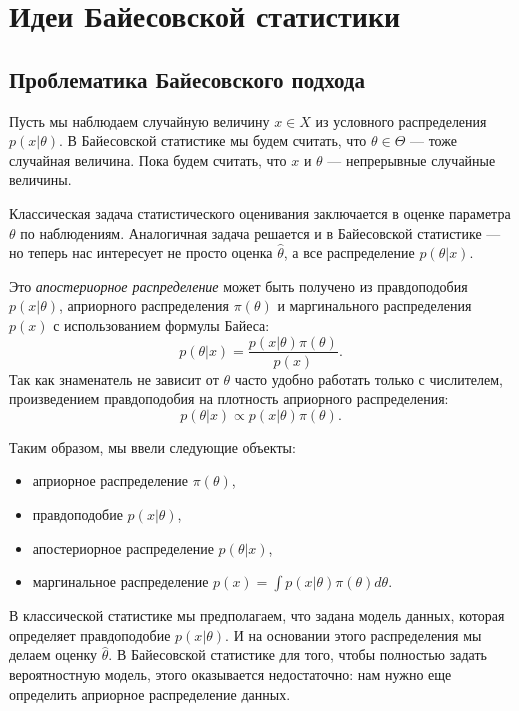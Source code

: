 \section{Идеи Байесовской статистики}

\subsection{Проблематика Байесовского подхода}

Пусть мы наблюдаем случайную величину $x \in X$ из условного распределения $p(x | \theta)$.
В Байесовской статистике мы будем считать, что $\theta \in \Theta$ --- тоже случайная величина. 
Пока будем считать, что $x$ и $\theta$ --- непрерывные случайные величины.

Классическая задача статистического оценивания заключается в оценке параметра $\theta$ по наблюдениям.
Аналогичная задача решается и в Байесовской статистике --- но теперь нас интересует не просто оценка $\hat{\theta}$,
а все распределение $p(\theta|x)$.

Это \emph{апостериорное распределение} может быть получено из правдоподобия $p(x| \theta)$, априорного распределения $\pi(\theta)$ и маргинального распределения $p(x)$
с использованием формулы Байеса:
\[
p(\theta | x) = \frac{p(x| \theta) \pi(\theta)}{p(x)}.
\]
Так как знаменатель не зависит от $\theta$ часто удобно работать только с числителем, произведением правдоподобия на плотность априорного распределения:
\[
p(\theta | x) \propto p(x| \theta) \pi(\theta).
\]

Таким образом, мы ввели следующие объекты:
\begin{itemize}
	\item априорное распределение $\pi(\theta)$, 
	\item правдоподобие $p(x| \theta)$, 
	\item апостериорное распределение $p(\theta | x)$, 
	\item маргинальное распределение $p(x) = \int p(x| \theta) \pi(\theta) d\theta$. 
\end{itemize}

В классической статистике мы предполагаем, что задана модель данных,
которая определяет правдоподобие $p(x| \theta)$.
И на основании этого распределения мы делаем оценку $\hat{\theta}$.
В Байесовской статистике для того, чтобы полностью задать вероятностную модель, этого оказывается недостаточно:
нам нужно еще определить априорное распределение данных.

